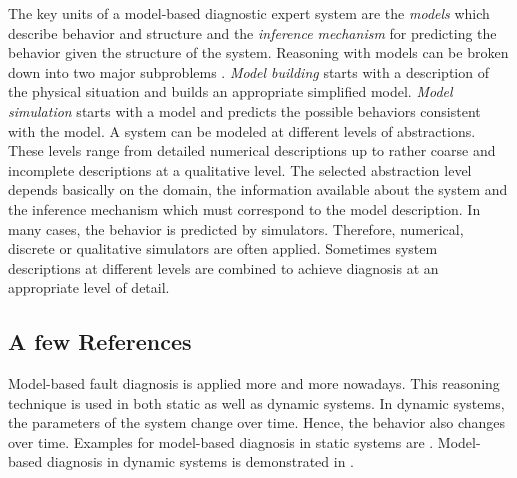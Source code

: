 The key units of a model-based diagnostic expert system are the {\em models\/} 
which describe behavior and structure and the {\em inference 
mechanism\/} for predicting the behavior given the structure of the system. 
Reasoning with models can be broken down into two major subproblems 
\cite{Kui86}.
{\em Model building\/} starts with a description of the physical situation and 
builds an appropriate simplified model. {\em Model simulation\/} starts with
a model and predicts the possible behaviors consistent with the model.
A system can be modeled at different levels of abstractions. These levels
range from detailed numerical descriptions up to rather coarse and incomplete
descriptions at a qualitative level. The selected abstraction level depends
basically on the domain, the information available about the system and the
inference mechanism which must correspond to the model description. 
In many cases, the behavior is predicted by simulators. Therefore, 
numerical, discrete or qualitative simulators are often applied. 
Sometimes system descriptions at different levels are combined to achieve 
diagnosis at an appropriate level of detail.

\subsection{A few References}

Model-based fault diagnosis is applied more and more nowadays. This reasoning
technique is used in both static as well as dynamic systems. In dynamic 
systems, the parameters of the system change over time. Hence, the behavior 
also changes over time. Examples for model-based diagnosis in static systems
are \cite{Bramberger_Computer2006, Bramberger_RTAS2004}. Model-based diagnosis in dynamic systems is 
demonstrated in \cite{Patterson2006} \cite{Aghajan_ICDSC2007}.

